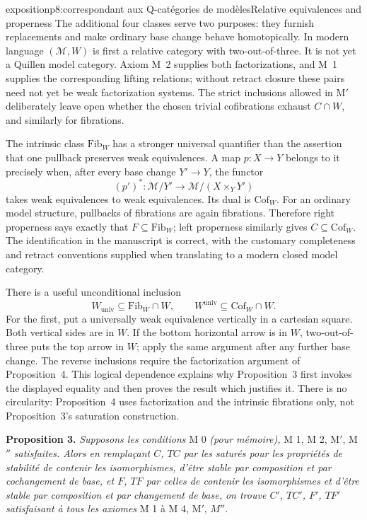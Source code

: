 \begin{dcomment}{exposition}{p8:correspondant aux Q-catégories de modèles}{Relative equivalences and properness}
The additional four classes serve two purposes: they furnish replacements and make ordinary base change behave homotopically. In modern language $(\mathcal M,W)$ is first a relative category with two-out-of-three. It is not yet a Quillen model category. Axiom M~2 supplies both factorizations, and M~1 supplies the corresponding lifting relations; without retract closure these pairs need not yet be weak factorization systems. The strict inclusions allowed in M$'$ deliberately leave open whether the chosen trivial cofibrations exhaust $C\cap W$, and similarly for fibrations.

The intrinsic class $\mathrm{Fib}_W$ has a stronger universal quantifier than the assertion that one pullback preserves weak equivalences. A map $p:X\to Y$ belongs to it precisely when, after every base change $Y'\to Y$, the functor
\[
 (p')^*:\mathcal M/Y'\longrightarrow\mathcal M/(X\times_Y Y')
\]
takes weak equivalences to weak equivalences. Its dual is $\mathrm{Cof}_W$. For an ordinary model structure, pullbacks of fibrations are again fibrations. Therefore right properness says exactly that $F\subseteq\mathrm{Fib}_W$; left properness similarly gives $C\subseteq\mathrm{Cof}_W$. The identification in the manuscript is correct, with the customary completeness and retract conventions supplied when translating to a modern closed model category.

There is a useful unconditional inclusion
\[
 W_{\mathrm{univ}}\subseteq\mathrm{Fib}_W\cap W,
 \qquad
 W^{\mathrm{univ}}\subseteq\mathrm{Cof}_W\cap W.
\]
For the first, put a universally weak equivalence vertically in a cartesian square. Both vertical sides are in $W$. If the bottom horizontal arrow is in $W$, two-out-of-three puts the top arrow in $W$; apply the same argument after any further base change. The reverse inclusions require the factorization argument of Proposition~4. This logical dependence explains why Proposition~3 first invokes the displayed equality and then proves the result which justifies it. There is no circularity: Proposition~4 uses factorization and the intrinsic fibrations only, not Proposition~3's saturation construction.
\end{dcomment}


\textbf{Proposition 3.} \textit{Supposons les conditions} M 0 \textit{(pour mémoire),} M 1, M 2, M$'$, M$''$ \textit{satisfaites. Alors en remplaçant $C$, $TC$ par les saturés pour les propriétés de stabilité de contenir les isomorphismes, d'être stable par composition et par cochangement de base, et $F$, $TF$ par celles de contenir les isomorphismes et d'être stable par composition et par changement de base, on trouve $C'$, $TC'$, $F'$, $TF'$ satisfaisant}
\textit{à tous les axiomes} M 1 à M 4, M$'$, $M''$. %

